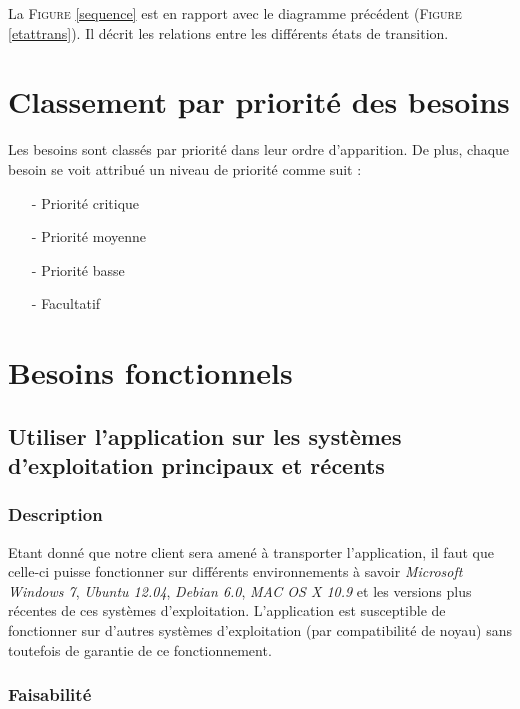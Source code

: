  La \textsc{Figure} \ref{sequence} est en rapport avec le diagramme précédent (\textsc{Figure} \ref{etattrans}). Il décrit les relations entre les différents états de transition.

\section{Classement par priorité des besoins}\label{priorite}

Les besoins sont classés par priorité dans leur ordre d'apparition. De plus, chaque besoin se voit attribué un niveau de priorité comme suit :

\begin{itemize}
 \item[-] Priorité critique
 \item[-] Priorité moyenne
 \item[-] Priorité basse
 \item[-] Facultatif
\end{itemize}

\section{Besoins fonctionnels}\label{besoins_fonctionnels}

\subsection{Utiliser l’application sur les systèmes d’exploitation principaux et récents}\label{systems}

\subsubsection{Description}

Etant donné que notre client sera amené à transporter l’application, il faut que celle-ci puisse fonctionner sur différents environnements à savoir \textit{Microsoft Windows 7}, \textit{Ubuntu 12.04}, \textit{Debian 6.0}, \textit{MAC OS X 10.9} et les versions plus récentes de ces systèmes d’exploitation.
L’application est susceptible de fonctionner sur d’autres systèmes d’exploitation (par compatibilité de noyau) sans toutefois de garantie de ce fonctionnement.

\subsubsection{Faisabilité}

